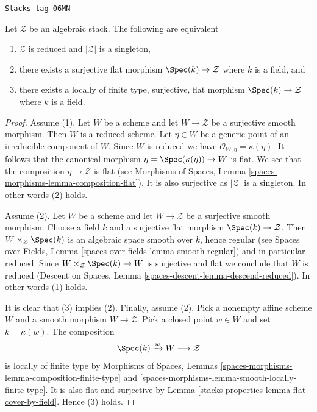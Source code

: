 \begin{lemma}
\label{stacks-properties-lemma-unique-point}
\href{https://stacks.math.columbia.edu/tag/06MN}{\texttt{Stacks tag 06MN}}

Let $\mathcal{Z}$ be an algebraic stack. The following are equivalent
\begin{enumerate}
\item $\mathcal{Z}$ is reduced and $|\mathcal{Z}|$ is a singleton,
\item there exists a surjective flat morphism $\Spec(k) \to \mathcal{Z}$
where $k$ is a field, and
\item there exists a locally of finite type, surjective, flat morphism
$\Spec(k) \to \mathcal{Z}$ where $k$ is a field.
\end{enumerate}
\end{lemma}

\begin{proof}
Assume (1). Let $W$ be a scheme and
let $W \to \mathcal{Z}$ be a surjective smooth morphism. Then $W$ is
a reduced scheme. Let $\eta \in W$ be a generic point of an irreducible
component of $W$. Since $W$ is reduced we have
$\mathcal{O}_{W, \eta} = \kappa(\eta)$. It follows that the canonical
morphism $\eta = \Spec(\kappa(\eta)) \to W$ is flat. We see that the
composition $\eta \to \mathcal{Z}$ is flat (see
Morphisms of Spaces, Lemma \ref{spaces-morphisms-lemma-composition-flat}).
It is also surjective as $|\mathcal{Z}|$ is a singleton. In other words
(2) holds.

\medskip\noindent
Assume (2). Let $W$ be a scheme and
let $W \to \mathcal{Z}$ be a surjective smooth morphism. Choose a field
$k$ and a surjective flat morphism $\Spec(k) \to \mathcal{Z}$.
Then $W \times_\mathcal{Z} \Spec(k)$ is an algebraic space smooth
over $k$, hence regular (see
Spaces over Fields, Lemma \ref{spaces-over-fields-lemma-smooth-regular})
and in particular reduced. Since $W \times_\mathcal{Z} \Spec(k) \to W$
is surjective and flat we conclude that $W$ is reduced
(Descent on Spaces, Lemma \ref{spaces-descent-lemma-descend-reduced}).
In other words (1) holds.

\medskip\noindent
It is clear that (3) implies (2). Finally, assume (2). Pick a nonempty
affine scheme $W$ and a smooth morphism $W \to \mathcal{Z}$. Pick a closed
point $w \in W$ and set $k = \kappa(w)$. The composition
$$
\Spec(k) \xrightarrow{w} W \longrightarrow \mathcal{Z}
$$
is locally of finite type by
Morphisms of Spaces, Lemmas
\ref{spaces-morphisms-lemma-composition-finite-type} and
\ref{spaces-morphisms-lemma-smooth-locally-finite-type}.
It is also flat and surjective by
Lemma \ref{stacks-properties-lemma-flat-cover-by-field}.
Hence (3) holds.
\end{proof}

